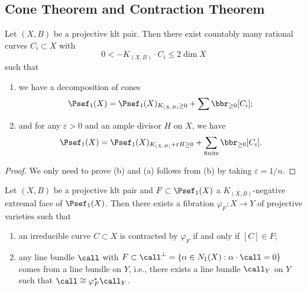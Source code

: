 \subsection{Cone Theorem and Contraction Theorem}

    \begin{theorem}\label{thm: cone theorem}
        Let \((X,B)\) be a projective klt pair.
        Then there exist countably many rational curves \(C_i \subset X\) with 
        \[ 0 < -K_{(X,B)} \cdot C_i \leq 2 \dim X \]
        such that 
        \begin{enumerate}
            \item we have a decomposition of cones
            \[ \Psef_1(X) = \Psef_1(X)_{K_{(X,B)} \geq 0} + \sum \bbr_{\geq 0}[C_i]; \]
            \item and for any \(\varepsilon > 0\) and an ample divisor \(H\) on \(X\), we have 
            \[ \Psef_1(X) = \Psef_1(X)_{K_{(X,B)}+\varepsilon H \geq 0} + \sum_{\text{finite}} \bbr_{\geq 0}[C_i]. \]
        \end{enumerate}
    \end{theorem}
    \begin{proof}
        We only need to prove (b) and (a) follows from (b) by taking \(\varepsilon = 1/n\).

    \end{proof}

    \begin{theorem}\label{thm: contraction theorem}
        Let \((X,B)\) be a projective klt pair and \(F \subset \Psef_1(X)\) a \(K_{(X,B)}\)-negative extremal face of \(\Psef_1(X)\).
        Then there exists a fibration \(\varphi_F: X \to Y\) of projective varieties such that
        \begin{enumerate}
            \item an irreducible curve \(C \subset X\) is contracted by \(\varphi_F\) if and only if \([C] \in F\);
            \item any line bundle \(\call\) with \(F \subset \call^{\perp} = \{\alpha \in N_1(X) : \alpha \cdot \call = 0\}\) comes from a line bundle on \(Y\), 
                i.e., there exists a line bundle \(\call_Y\) on \(Y\) such that \(\call \cong \varphi_F^* \call_Y\).
        \end{enumerate}
    \end{theorem}

    
